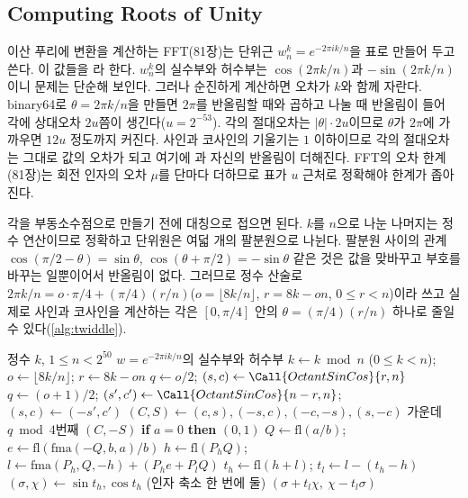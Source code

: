 \subsection{Computing Roots of Unity}
\label{sec:twiddle}

이산 푸리에 변환을 계산하는 FFT(81장)는 단위근 $w_n^k=e^{-2\pi ik/n}$을 표로 만들어 두고 쓴다. 이 값들을 라 한다. $w_n^k$의 실수부와 허수부는 $\cos(2\pi k/n)$과 $-\sin(2\pi k/n)$이니 문제는 단순해 보인다. 그러나 순진하게 계산하면 오차가 $k$와 함께 자란다. binary64로 $\theta=2\pi k/n$을 만들면 $2\pi$를 반올림할 때와 곱하고 나눌 때 반올림이 들어 각에 상대오차 $2u$쯤이 생긴다($u=2^{-53}$). 각의 절대오차는 $|\theta|\cdot2u$이므로 $\theta$가 $2\pi$에 가까우면 $12u$ 정도까지 커진다. 사인과 코사인의 기울기는 $1$ 이하이므로 각의 절대오차는 그대로 값의 오차가 되고 여기에 과  자신의 반올림이 더해진다. FFT의 오차 한계(81장)는 회전 인자의 오차 $\mu$를 단마다 더하므로 표가 $u$ 근처로 정확해야 한계가 좁아진다.

각을 부동소수점으로 만들기 전에 대칭으로 접으면 된다. $k$를 $n$으로 나눈 나머지는 정수 연산이므로 정확하고 단위원은 여덟 개의 팔분원으로 나뉜다. 팔분원 사이의 관계 $\cos(\pi/2-\theta)=\sin\theta$, $\cos(\theta+\pi/2)=-\sin\theta$ 같은 것은 값을 맞바꾸고 부호를 바꾸는 일뿐이어서 반올림이 없다. 그러므로 정수 산술로 $2\pi k/n=o\cdot\pi/4+(\pi/4)(r/n)$($o=\lfloor8k/n\rfloor$, $r=8k-on$, $0\le r<n$)이라 쓰고 실제로 사인과 코사인을 계산하는 각은 $[0,\pi/4]$ 안의 $\theta=(\pi/4)(r/n)$ 하나로 줄일 수 있다(\cref{alg:twiddle}).

\begin{algorithm}[htbp]
\begin{algorithmic}[1]
\Require 정수 $k$, $1\le n<2^{50}$
\Ensure $w=e^{-2\pi ik/n}$의 실수부와 허수부
\State $k\gets k\bmod n$ ($0\le k<n$); $o\gets\lfloor8k/n\rfloor$; $r\gets8k-on$ 
  \State $q\gets o/2$; $(s,c)\gets\Call{OctantSinCos}{r,n}$ 
\Else
  \State $q\gets(o+1)/2$; $(s',c')\gets\Call{OctantSinCos}{n-r,n}$; $(s,c)\gets(-s',c')$ 
\EndIf
\State $(C,S)\gets(c,s),(-s,c),(-c,-s),(s,-c)$ 가운데 $q\bmod4$번째 
\State \Return $(C,-S)$
\Statex
{} 
  \State \textbf{if} $a=0$ \textbf{then} \Return $(0,1)$
  \State $Q\gets\mathrm{fl}(a/b)$; $e\gets\mathrm{fl}(\mathrm{fma}(-Q,b,a)/b)$ 
  \State $h\gets\mathrm{fl}(P_hQ)$; $l\gets\mathrm{fma}(P_h,Q,-h)+(P_he+P_lQ)$ 
  \State $t_h\gets\mathrm{fl}(h+l)$; $t_l\gets l-(t_h-h)$ 
  \State $(\sigma,\chi)\gets\sin t_h,\cos t_h$ (인자 축소 한 번에 둘)
  \State \Return $(\sigma+t_l\chi,\ \chi-t_l\sigma)$ 
\EndFunction
\end{algorithmic}
\caption{회전 인자 $e^{-2\pi ik/n}$ (stardust 의 )}
\label{alg:twiddle}
\end{algorithm}

